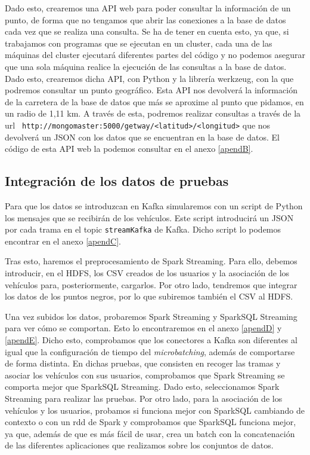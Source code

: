 Dado esto, crearemos una API web para poder consultar la información de un
punto, de forma que no tengamos que abrir las conexiones a la base de datos
cada vez que se realiza una consulta. Se ha de tener en cuenta esto, ya
que, si trabajamos con programas que se ejecutan en un cluster, cada una de
las máquinas del cluster ejecutará diferentes partes del código y no
podemos asegurar que una sola máquina realice la ejecución de las consultas
a la base de datos. Dado esto, crearemos dicha API, con Python y la
librería werkzeug, con la que podremos consultar un punto geográfico. Esta
API nos devolverá la información de la carretera de la base de datos que
más se aproxime al punto que pidamos, en un radio de 1,11 km. A través de
esta, podremos realizar consultas a través de la url {\tt
  http://mongomaster:5000/getway/<latitud>/<longitud>} que nos devolverá un
JSON con los datos que se encuentran en la base de datos. El código de esta
API web la podemos consultar en el anexo \ref{apendB}.

\subsection {Integración de los datos de pruebas \label{integracion}}

Para que los datos se introduzcan en Kafka simularemos con un script de
Python los mensajes que se recibirán de los vehículos. Este script
introducirá un JSON por cada trama en el topic {\tt streamKafka} de Kafka.
Dicho script lo podemos encontrar en el anexo \ref{apendC}.

Tras esto, haremos el preprocesamiento de Spark Streaming. Para ello,
debemos introducir, en el HDFS, los CSV creados de los usuarios y la
asociación de los vehículos para, posteriormente, cargarlos. Por otro lado,
tendremos que integrar los datos de los puntos negros, por lo que subiremos
también el CSV al HDFS.

Una vez subidos los datos, probaremos Spark Streaming y SparkSQL Streaming
para ver cómo se comportan. Esto lo encontraremos en el anexo \ref{apendD}
y \ref{apendE}. Dicho esto, comprobamos que los conectores a Kafka son
diferentes al igual que la configuración de tiempo del {\em microbatching},
además de comportarse de forma distinta. En dichas pruebas, que consisten
en recoger las tramas y asociar los vehículos con sus usuarios, comprobamos
que Spark Streaming se comporta mejor que SparkSQL Streaming. Dado esto,
seleccionamos Spark Streaming para realizar las pruebas. Por otro lado,
para la asociación de los vehículos y los usuarios, probamos si funciona
mejor con SparkSQL cambiando de contexto o con un rdd de Spark y
comprobamos que SparkSQL funciona mejor, ya que, además de que es más fácil
de usar, crea un batch con la concatenación de las diferentes aplicaciones
que realizamos sobre los conjuntos de datos.

